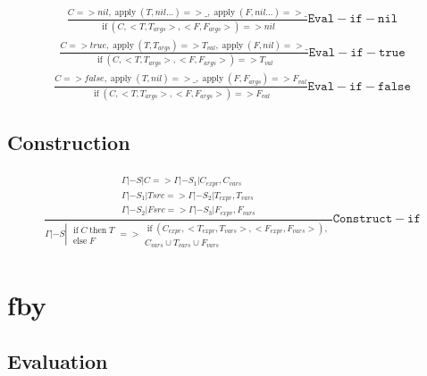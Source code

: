 \documentclass{scrartcl}
\DeclareMathOperator{\apply}{apply}
\DeclareMathOperator{\ifop}{if}
\DeclareMathOperator{\thenop}{then}
\DeclareMathOperator{\elseop}{else}
\begin{document}
    \begin{align*}
    \frac{
        C => nil, \apply(T, nil\dots) => \_, \apply(F, nil\dots) => \_
    }{
        \ifop(C, <T, T_{args}>, <F, F_{args}>) => nil
    }\mathtt{Eval-if-nil}
    \end{align*}
    \begin{align*}
    \frac{
        C => true, \apply(T,T_{args}) => T_{val}, \apply(F, nil) => \_
    }{
        \ifop(C, <T, T_{args}>, <F, F_{args}>) => T_{val}
    }\mathtt{Eval-if-true}
    \end{align*}
    \begin{align*}
    \frac{
        C => false, \apply(T, nil) => \_, \apply(F, F_{args}) => F_{val}
    }{
        \ifop(C, <T, T_{args}>, <F, F_{args}>) => F_{val}
    }\mathtt{Eval-if-false}
    \end{align*}
    
    \subsection{Construction}
    
    \begin{align*}
    \frac{
        \begin{matrix}
        \Gamma |- S | C => \Gamma |- S_1 | C_{expr}, C_{vars} \\
        \Gamma |- S_1 | Tsrc => \Gamma |- S_2 | T_{expr}, T_{vars} \\
        \Gamma |- S_2 | Fsrc => \Gamma |- S_3 | F_{expr}, F_{vars}
        \end{matrix}
    }
    {\Gamma |- S \left| \begin{matrix}
        \ifop C \thenop T \\
        \elseop F
        \end{matrix} \right. =>
        \begin{matrix}
        \ifop(C_{expr}, <T_{expr}, T_{vars}>, <F_{expr}, F_{vars}>), \\
        C_{vars} \cup T_{vars} \cup F_{vars}
        \end{matrix}
    }\mathtt{Construct-if}
    \end{align*}
    
    \section{fby}
    
    \subsection{Evaluation}
    
\end{document}
